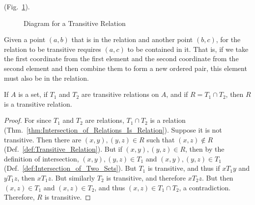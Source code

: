     (Fig.~\ref{fig:Transitive_Relation_Diagram}).
    \begin{figure}[H]
        \centering
        \captionsetup{type=figure}
        
        \caption{Diagram for a Transitive Relation}
        \label{fig:Transitive_Relation_Diagram}
    \end{figure}
    Given a point $(a,b)$ that is in the relation and another point $(b,c)$, for
    the relation to be transitive requires $(a,c)$ to be contained in it. That
    is, if we take the first coordinate from the first element and the second
    coordinate from the second element and then combine them to form a new
    ordered pair, this element must also be in the relation.
    \begin{theorem}
        If $A$ is a set, if $T_{1}$ and $T_{2}$ are transitive relations on $A$,
        and if $R=T_{1}\cap{T}_{2}$, then $R$ is a transitive relation.
    \end{theorem}
    \begin{proof}
        For since $T_{1}$ and $T_{2}$ are relations, $T_{1}\cap{T}_{2}$ is a
        relation (Thm.~\ref{thm:Intersection_of_Relations_Is_Relation}). Suppose
        it is not transitive. Then there are $(x,y),(y,z)\in{R}$ such that
        $(x,z)\notin{R}$ (Def.~\ref{def:Transitive_Relation}). But if
        $(x,y),(y,z)\in{R}$, then by the definition of intersection,
        $(x,y),(y,z)\in{T}_{1}$ and $(x,y),(y,z)\in{T}_{1}$
        (Def.~\ref{def:Intersection_of_Two_Sets}). But $T_{1}$ is transitive, and
        thus if $xT_{1}y$ and $yT_{1}z$, then $xT_{1}z$. But similarly $T_{2}$
        is transitive, and therefore $xT_{2}z$. But then $(x,z)\in{T}_{1}$ and
        $(x,z)\in{T}_{2}$, and thus $(x,z)\in{T}_{1}\cap{T}_{2}$, a
        contradiction. Therefore, $R$ is transitive.
    \end{proof}
